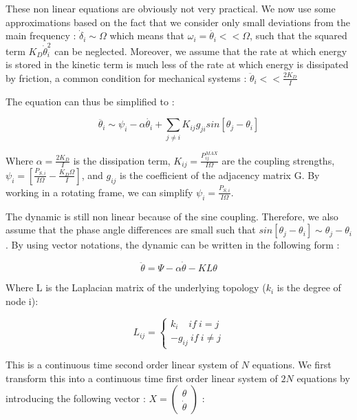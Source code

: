 \documentclass[conference]{IEEEtran}
\begin{document}
These non linear equations are obviously not very practical. We now use some approximations based on the fact that we consider only small deviations from the main frequency : $ \dot{ \delta}_i \sim \Omega $ which means that $ \omega_i = \dot{\theta_i} << \Omega $, such that the squared term $ K_D \dot{\theta}_i^2 $ can be neglected.
Moreover, we assume that the rate at which energy is stored in the kinetic term is much less of the rate at which energy is dissipated by friction, a common condition for mechanical systems : $ \ddot{ \theta }_i  << \frac{2 K_D}{I} $

The equation can thus be simplified to :

\begin{equation}
 \ddot{ \theta_i } \sim \psi_i - \alpha \dot{ \theta_i } + \sum_{j\neq i} K_{ij} g_{ji} sin \left[ \theta_j - \theta_i \right] 
\end{equation}

Where $ \alpha = \frac{2 K_D}{I} $ is the dissipation term, $ K_{ij} = \frac{P_{ij}^{MAX}}{I \Omega} $ are the coupling strengths, $ \psi_i = \left[ \frac{P_{S,i}}{I \Omega} - \frac{K_D \Omega}{I} \right] $, and $ g_{ij} $ is the coefficient of the adjacency matrix G.
By working in a rotating frame, we can simplify $ \psi_i=\frac{P_{S,i}}{I \Omega} $.

The dynamic is still non linear because of the sine coupling. Therefore, we also assume that the phase angle differences are small such that $ sin \left[ \theta_j - \theta_i \right] \sim \theta_j - \theta_i $. By using vector notations, the dynamic can be written in the following form :

\begin{equation}
\ddot{\theta} = \Psi - \alpha \dot{\theta} - KL\theta
\end{equation}

Where L is the Laplacian matrix of the underlying topology ($ k_i $ is the degree of node i):

\begin{equation}
L_{ij} = \left\{ \begin{array}{lll} k_i\ \ \ \ \,if\ i=j \\ -g_{ij}\  if\ i \neq j \end{array} \right. 
\end{equation}


This is a continuous time second order linear system of $ N $ equations. We first transform this into a continuous time first order linear system of $ 2 N $ equations by introducing the following vector : $ X = \left( \begin{array}{c} \theta \\ \dot{\theta} \end{array} \right)$ : 
\end{document}

